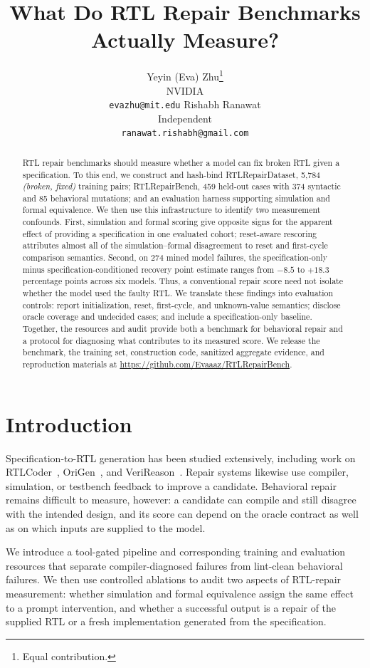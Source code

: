 \documentclass{article}
\title{What Do RTL Repair Benchmarks Actually Measure?}
\author{%
  Yeyin (Eva) Zhu\thanks{Equal contribution.}\\
  NVIDIA\\
  \texttt{evazhu@mit.edu}
  \And
  Rishabh Ranawat\footnotemark[1]\\
  Independent\\
  \texttt{ranawat.rishabh@gmail.com}
}
\newcommand{\releaseurl}{https://github.com/Evaaaz/RTLRepairBench}
\begin{document}
\maketitle

\begin{abstract}
RTL repair benchmarks should measure whether a model can fix broken RTL given a specification. To
this end, we construct and hash-bind RTLRepairDataset, 5{,}784 \emph{(broken, fixed)} training pairs;
RTLRepairBench, 459 held-out cases with 374 syntactic and 85 behavioral mutations; and an evaluation
harness supporting simulation and formal equivalence. We then use this infrastructure to identify two
measurement confounds. First, simulation and formal scoring give opposite
signs for the apparent effect of providing a specification in one evaluated cohort; reset-aware rescoring attributes almost
all of the simulation--formal disagreement to reset and first-cycle comparison semantics. Second,
on 274 mined model failures, the specification-only minus specification-conditioned recovery point
estimate ranges from $-8.5$ to $+18.3$ percentage points across six models. Thus, a conventional repair score
need not isolate whether the model used the faulty RTL. We translate these findings into evaluation
controls: report initialization, reset, first-cycle, and unknown-value semantics; disclose oracle
coverage and undecided cases; and include a specification-only baseline. Together, the resources and
audit provide both a benchmark for behavioral repair and a protocol for diagnosing what contributes
to its measured score. We release the benchmark, the training set, construction code,
sanitized aggregate evidence, and reproduction materials at \url{\releaseurl}.
\end{abstract}

\section{Introduction}

Specification-to-RTL generation has been studied extensively, including work on RTLCoder~\cite{rtlcoder},
OriGen~\cite{origen}, and VeriReason~\cite{verireason}. Repair systems likewise use compiler,
simulation, or testbench feedback to improve a candidate. Behavioral repair remains difficult to
measure, however: a candidate can compile and still disagree with the intended design, and its score
can depend on the oracle contract as well as on which inputs are supplied to the model.

We introduce a tool-gated pipeline and corresponding training and evaluation resources that separate
compiler-diagnosed failures from lint-clean behavioral failures. We then use controlled ablations to
audit two aspects of RTL-repair measurement: whether simulation and formal equivalence assign the
same effect to a prompt intervention, and whether a successful output is a repair of the supplied RTL
or a fresh implementation generated from the specification.
\end{document}
